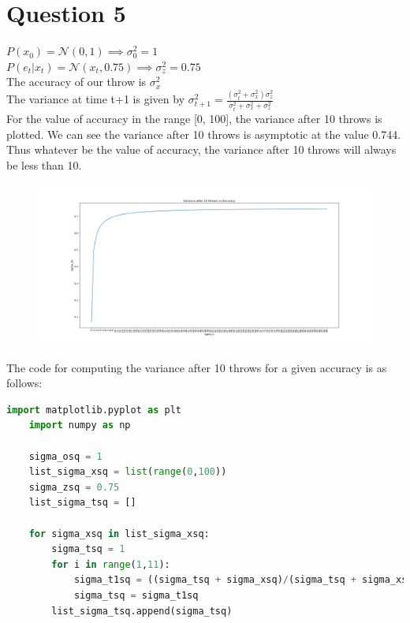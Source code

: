 \documentclass[letter, 9pt]{article}
\begin{document}
\section*{Question 5}
$P(x_0) = \mathcal{N}(0,1) \implies \sigma_0^2=1$\\
$P(e_t|x_t) = \mathcal{N}(x_t,0.75) \implies \sigma_z^2=0.75$\\
The accuracy of our throw is $\sigma_x^2$\\
The variance at time t+1 is given by $\sigma_{t+1}^2 = \frac{(\sigma_t^2 + \sigma_x^2)\sigma_z^2}{\sigma_t^2 + \sigma_x^2 + \sigma_z^2}$\\
For the value of accuracy in the range [0, 100], the variance after 10 throws is plotted. We can see the variance after 10 throws is asymptotic at the value 0.744. Thus whatever be the value of accuracy, the variance after 10 throws will always be less than 10.

\begin{figure}[H]
    \centering
        \includegraphics[width=\textwidth, height=0.3\textwidth]{HW3/variance.png}
\end{figure}

The code for computing the variance after 10 throws for a given accuracy is as follows:
\begin{lstlisting}[language=Python]
    import matplotlib.pyplot as plt
    import numpy as np
    
    sigma_osq = 1
    list_sigma_xsq = list(range(0,100))
    sigma_zsq = 0.75
    list_sigma_tsq = []
    
    for sigma_xsq in list_sigma_xsq:
        sigma_tsq = 1
        for i in range(1,11):
            sigma_t1sq = ((sigma_tsq + sigma_xsq)/(sigma_tsq + sigma_xsq + sigma_zsq))*sigma_zsq
            sigma_tsq = sigma_t1sq
        list_sigma_tsq.append(sigma_tsq)
\end{lstlisting}

\newpage
\end{document}
